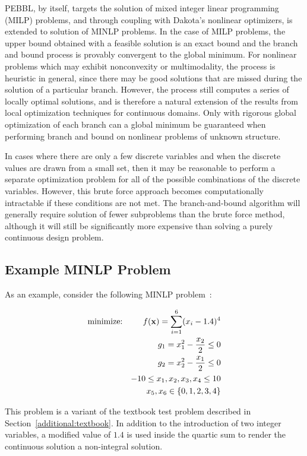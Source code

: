 PEBBL, by itself, targets the solution of mixed integer linear
programming (MILP) problems, and through coupling with Dakota's
nonlinear optimizers, is extended to solution of MINLP problems. In
the case of MILP problems, the upper bound obtained with a feasible
solution is an exact bound and the branch and bound process is
provably convergent to the global minimum. For nonlinear problems
which may exhibit nonconvexity or multimodality, the process is
heuristic in general, since there may be good solutions that are
missed during the solution of a particular branch. However, the
process still computes a series of locally optimal solutions, and is
therefore a natural extension of the results from local optimization
techniques for continuous domains. Only with rigorous global
optimization of each branch can a global minimum be guaranteed when
performing branch and bound on nonlinear problems of unknown
structure.

In cases where there are only a few discrete variables and when the
discrete values are drawn from a small set, then it may be reasonable
to perform a separate optimization problem for all of the possible
combinations of the discrete variables. However, this brute force
approach becomes computationally intractable if these conditions are
not met. The branch-and-bound algorithm will generally require
solution of fewer subproblems than the brute force method, although it
will still be significantly more expensive than solving a purely
continuous design problem.

\subsection{Example MINLP Problem}\label{adv_meth:minlp:example}

As an example, consider the following MINLP problem~\cite{Eld99}:

\begin{eqnarray}
  \hbox{minimize:} & &
  f(\mathbf{x})=\sum_{i=1}^{6}(x_{i}-1.4)^{4}\nonumber\\
  & & g_{1}=x_{1}^{2}-\frac{x_{2}}{2} \leq 0\nonumber\\
  & & g_{2}=x_{2}^{2}-\frac{x_{1}}{2} \leq 0\label{adv_meth:equation02}\\
  & & -10 \leq x_{1},x_{2},x_{3},x_{4} \leq 10\nonumber\\
  & & x_{5},x_{6} \in \{0,1,2,3,4\}\nonumber
\end{eqnarray}

This problem is a variant of the textbook test problem described in
Section~\ref{additional:textbook}. In addition to the introduction of
two integer variables, a modified value of $1.4$ is used inside the
quartic sum to render the continuous solution a non-integral solution.

